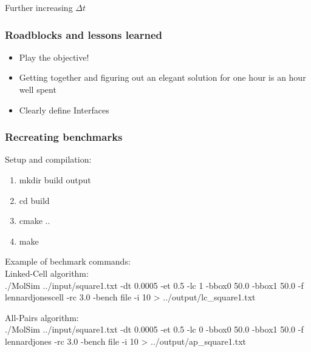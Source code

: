 \begin{frame}{Further increasing $\Delta t$}
	\begin{figure}[h!]
		\centering    
	\end{figure} 
\end{frame}

\begin{frame}
	\frametitle{Roadblocks and lessons learned}
	\large
	\begin{itemize}
		\item Play the objective!
		\item Getting together and figuring out an elegant solution for one hour is an hour well spent
		\item Clearly define Interfaces
	\end{itemize}
\end{frame}

\begin{frame}
	\PraesentationBildUhrenturm
\end{frame}

\begin{frame}
	\frametitle{Recreating benchmarks}
	\large
	Setup and compilation:
	\vspace{-0.7cm}
	\begin{enumerate}
		\item mkdir build output
		\item cd build
		\item cmake ..
		\item make
	\end{enumerate}
	\vspace{-0.6cm}

	Example of bechmark commands:\\
	Linked-Cell algorithm:\\
	./MolSim ../input/square1.txt -dt 0.0005 -et 0.5 -lc 1 -bbox0 50.0 -bbox1 50.0 -f lennardjonescell -rc 3.0 -bench file -i 10 > ../output/lc\_square1.txt
	
	All-Pairs algorithm:\\
	./MolSim ../input/square1.txt -dt 0.0005 -et 0.5 -lc 0 -bbox0 50.0 -bbox1 50.0 -f lennardjones -rc 3.0 -bench file -i 10 > ../output/ap\_square1.txt\\
	
	\large


\end{frame}

